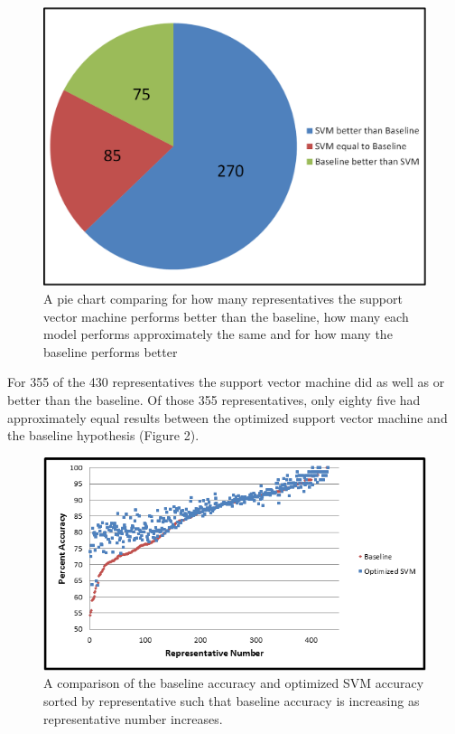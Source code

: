 \documentclass[11pt,letterpaper,twocolumn]{article}
\begin{document}
\begin{figure}
\includegraphics[width=\columnwidth]{pie_chart_1.png}
\caption{A pie chart comparing for how many representatives the support vector machine performs better than the baseline, how many each model performs approximately the same and for how many the baseline performs better}
\end{figure}

For 355 of the 430 representatives the support vector machine did as well as or better than the baseline. Of those 355 representatives, only eighty five had approximately equal results between the optimized support vector machine and the baseline hypothesis (Figure 2).

\begin{figure}[t]
\includegraphics{accuracy_comparison2.png}
\caption{A comparison of the baseline accuracy and optimized SVM accuracy sorted by representative such that baseline accuracy is increasing as representative number increases.}
\end{figure}
\end{document}
